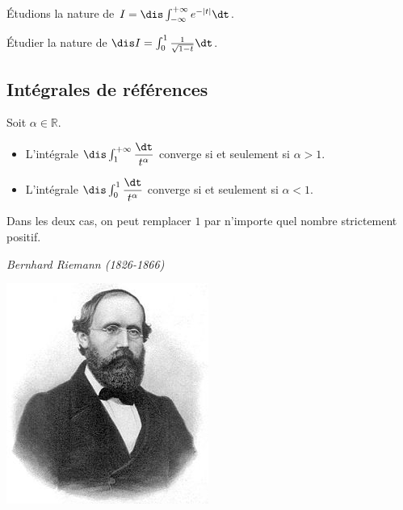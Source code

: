 \documentclass[a4paper,10pt]{report}
\begin{document}
\begin{ex} Étudions la nature de $I=\dis \int_{- \infty}^{+ \infty} e^{-\vert t \vert} \dt$.

\newpage

\end{ex}
\begin{exa} Étudier la nature de $\dis  I= \int_{0}^1 \frac{1}{\sqrt{1-t}} \dt$.
\end{exa} 

\subsection{Intégrales de références}

\begin{prop}
Soit $\alpha \in \mathbb{R}$.
\begin{itemize}
\item L'intégrale $\dis \int_{1}^{+ \infty} \dfrac{\dt}{t^{\alpha}}$ converge si et seulement si $\alpha>1$.
\item L'intégrale $\dis \int_{0}^{1} \dfrac{\dt}{t^{\alpha}}$ converge si et seulement si $\alpha<1$.
\end{itemize}
\end{prop} 

\begin{rem} Dans les deux cas, on peut remplacer $1$ par n'importe quel nombre strictement positif.
\end{rem}

\medskip

\begin{center}
\textit{Bernhard Riemann (1826-1866)}

\includegraphics[scale=0.4]{Riemann}
\end{center}
\end{document}
